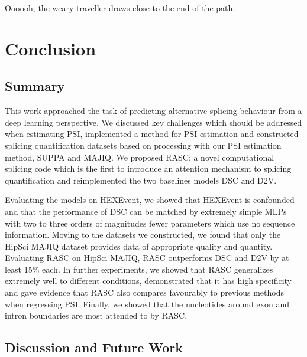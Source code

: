 \begin{savequote}[8cm]
	
	Oooooh, the weary traveller draws close to the end of the path.
\end{savequote}

\chapter{\label{ch:6-conclusion}Conclusion} %
\section{Summary}
This work approached the task of predicting alternative splicing behaviour from a deep learning perspective.
We discussed key challenges which should be addressed when estimating PSI, implemented a method for PSI estimation and constructed splicing quantification datasets based on processing with our PSI estimation method, SUPPA and MAJIQ. We proposed RASC: a novel computational splicing code which is the first to introduce an attention mechanism to splicing quantification and reimplemented the two baselines models DSC and D2V. %

Evaluating the models on HEXEvent, we showed that HEXEvent is confounded and that the performance of DSC can be matched by extremely simple MLPs with two to three orders of magnitudes fewer parameters which use no sequence information. 
Moving to the datasets we constructed, we found that only the HipSci MAJIQ dataset provides data of appropriate quality and quantity. Evaluating RASC on HipSci MAJIQ, RASC outperforms DSC and D2V by at least 15\% each. In further experiments, we showed that RASC generalizes extremely well to different conditions, demonstrated that it has high specificity and gave evidence that RASC also compares favourably to previous methods when regressing PSI. Finally, we showed that the nucleotides around exon and intron boundaries are most attended to by RASC.
\section{Discussion and Future Work}
